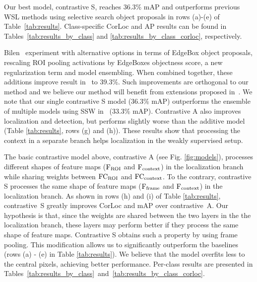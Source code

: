 \documentclass[runningheads]{llncs}
\begin{document}
Our best model, contrastive S, reaches 36.3\% mAP and outperforms previous WSL methods using selective search object proposals in rows (a)-(e) of Table~\ref{tab:results}.
Class-specific CorLoc and AP results can be found in Tables~\ref{tab:results_by_class} and \ref{tab:results_by_class_corloc}, respectively.

Bilen~\etal\cite{Bilen:2015uo} experiment with alternative options in terms of EdgeBox object proposals, rescaling ROI pooling activations by EdgeBoxes objectness score, a new regularization term and model ensembling. When combined together, these additions improve result in~\cite{Bilen:2015uo} to 39.3\%. Such improvements are orthogonal to our method and we believe our method will benefit from extensions proposed in~\cite{Bilen:2015uo}. We note that our single contrastive S model (36.3\% mAP) outperforms the ensemble of multiple models using SSW in~\cite{Bilen:2015uo} (33.3\% mAP).
Contrastive A also improves localization and detection, but performs slightly worse than the additive model (Table \ref{tab:results}, rows (g) and (h)). 
These results show that processing the context in a separate branch helps 
localization in the weakly supervised setup.


The basic contrastive model above, contrastive A (see Fig. \ref{fig:models}), processes different shapes of feature maps (${\rm F_{ROI}}$ and ${\rm F_{context}}$) in the localization branch while sharing weights between ${\rm FC_{ROI}}$ and ${\rm FC_{context}}$. To the contrary, contrastive S processes the same shape of feature maps (${\rm F_{frame}}$ and ${\rm F_{context}}$) in the localization branch. As shown in rows (h) and (i) of Table \ref{tab:results}, contrastive~S greatly improves CorLoc and mAP over contrastive~A. Our hypothesis is that, since the weights are shared between the two layers in the the localization
branch, these layers may perform better if they process the same shape of feature maps. Contrastive S obtains such a property by using frame pooling.  
This modification allows us to significantly outperform the baselines (rows (a) - (e) in Table \ref{tab:results}). 
We believe that the model overfits less to the central pixels, achieving better performance.
Per-class results are presented in Tables~\ref{tab:results_by_class}~and~\ref{tab:results_by_class_corloc}.
\end{document}

